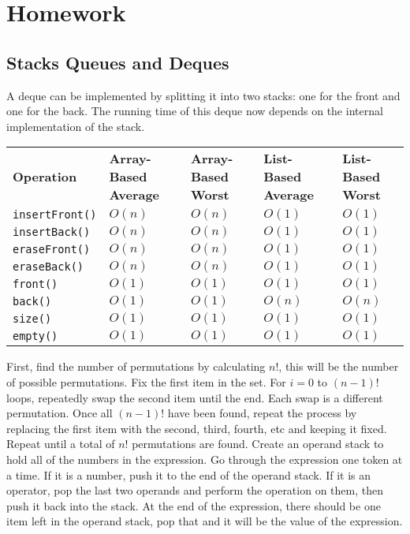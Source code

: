 \section{Homework}
\subsection{Stacks Queues and Deques}
A deque can be implemented by splitting it into two stacks: one for the front and one for the back.  The running time of this deque now depends on the internal implementation of the stack.
\newline
\newline
\begin{tabular}{|lllll|}
  \textbf{Operation} & \textbf{Array-Based Average} & \textbf{Array-Based Worst} & \textbf{List-Based Average} & \textbf{List-Based Worst} \\
  \texttt{insertFront()} & $O(n)$ & $O(n)$ & $O(1)$ & $O(1)$ \\
  \texttt{insertBack()} & $O(n)$ & $O(n)$ & $O(1)$ & $O(1)$ \\
  \texttt{eraseFront()}  & $O(n)$ & $O(n)$ & $O(1)$ & $O(1)$ \\
  \texttt{eraseBack()} & $O(n)$ & $O(n)$ & $O(1)$ & $O(1)$ \\
  \texttt{front()} & $O(1)$ & $O(1)$ & $O(1)$ & $O(1)$ \\
  \texttt{back()} & $O(1)$ & $O(1)$ & $O(n)$ & $O(n)$ \\
  \texttt{size()} & $O(1)$ & $O(1)$ & $O(1)$ & $O(1)$ \\
  \texttt{empty()} & $O(1)$ & $O(1)$ & $O(1)$ & $O(1)$
\end{tabular}
First, find the number of permutations by calculating $n!$, this will be the number of possible permutations.  Fix the first item in the set.  For $i=0$ to $(n-1)!$ loops, repeatedly swap the second item until the end.  Each swap is a different permutation.  Once all $(n-1)!$ have been found, repeat the process by replacing the first item with the second, third, fourth, etc and keeping it fixed.  Repeat until a total of $n!$ permutations are found.
Create an operand stack to hold all of the numbers in the expression.  Go through the expression one token at a time.  If it is a number, push it to the end of the operand stack.  If it is an operator, pop the last two operands and perform the operation on them, then push it back into the stack.  At the end of the expression, there should be one item left in the operand stack, pop that and it will be the value of the expression.
